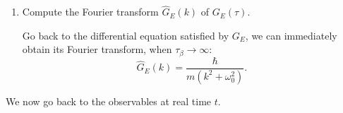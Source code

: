 \begin{enumerate}[label=\alph*)]
\begin{solution}
\begin{equation}
            \end{equation}
            The matching condition at $\tau=0$ implies
            \begin{equation}
                A + D = \frac{\hbar}{2m\omega_0 }.
            \end{equation}
            For $T\to 0$, $\tau_\beta \to \infty$, we find
            \begin{equation}
                G_E (\tau) = \frac{\hbar}{m}\,\frac{1}{2\omega_0}\exp(-|\tau|\omega_0).
            \end{equation}
            For finite $\tau_\beta$, we find
            \begin{equation}
                G_E(\tau;\beta) = \frac{\hbar}{m}\,\frac{1}{2\omega_0}
            \frac{\cosh\!\left(\omega_0(\tau_\beta/2 - |\tau|)\right)}{\sinh\!\left(\omega_0\tau_\beta/2\right)},
            \qquad 0 \leq \tau \leq \tau_\beta.
            \end{equation}
        \end{solution}
        
    
        \item Compute the Fourier transform $\hat{G}_E(k)$ of $G_E(\tau)$.
        \begin{solution}
            Go back to the differential equation satisfied by $G_E$, we can immediately 
obtain its Fourier transform, when $\tau_\beta \to \infty$:
            \begin{equation}
                \hat{G}_E(k) = \frac{\hbar}{m(k^2+\omega_0^2)}.
            \end{equation}
        \end{solution}
    
    \end{enumerate}
    
    We now go back to the observables at real time $t$.
    
